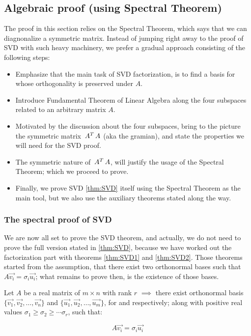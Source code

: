 \subsection{Algebraic proof (using Spectral Theorem)}

The proof in this section relies on the Spectral Theorem, which says
that we can diagnonalize a symmetric matrix. Instead of jumping right
away to the proof of SVD with such heavy machinery, we prefer a
gradual approach consisting of the following steps: \\

\begin{itemize}
\item Emphasize that the main task of SVD factorization, is to find a
  basis for  whose orthogonality is preserved under $A$.
\item Introduce Fundamental Theorem of Linear Algebra along the four
  subspaces related to an arbitrary matrix 
  $A$.
\item Motivated by the discussion about the four subspaces, bring to the
  picture the symmetric matrix $\,{A}^{T}\,A$ (aka the gramian), and
  state the properties we will need for the SVD proof.
\item The symmetric nature of $\,{A}^{T}\, A$, will justify the
  usage of the Spectral Theorem; which we proceed to prove.
\item Finally, we  prove SVD \cref{thm:SVD} itself using the Spectral
  Theorem as the main tool, but we also use  the auxiliary theorems
  stated along the way.
\end{itemize}
\hfill






\subsubsection{The spectral proof of SVD}

We are now all set to prove the SVD theorem, and actually, we do not
need to prove the full version stated in \cref{thm:SVD},
because we have worked out the factorization part with theorems
\cref{thm:SVD1} and \cref{thm:SVD2}. Those theorems started from the
assumption, that there exist two orthonormal bases such that $A\vec{v_i} =
\sigma_i\vec{u_i}$; what remains to prove then, is the existence of
those bases. \\

\begin{theorem}
\label{thm:SVD3}
Let $A$ be a real matrix of $m \times n$ with rank $r$ $\implies$ there exist
orthonormal basis $\{\vec{v_1},\vec{v_2},\dots,\vec{v_n}\}$ and
$\{\vec{u_1},\vec{u_2},\dots,\vec{u_m}\}$, for  and 
respectively; along with positive real values $\sigma_1 \ge \sigma_2 \ge \cdots
\sigma_r$, such that: 

\[
A\vec{v_i} = \sigma_i\vec{u_i}
\]
\end{theorem}
\hfill

